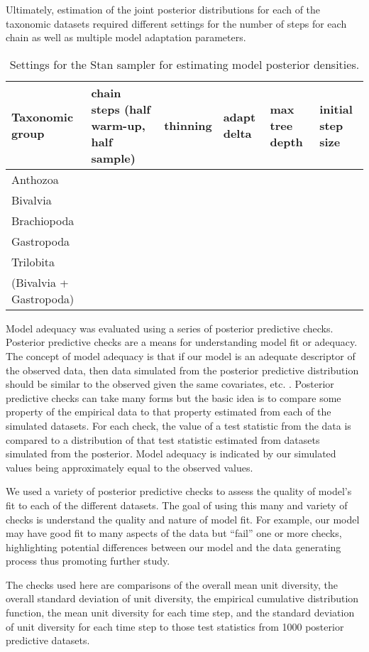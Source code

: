 \documentclass[12pt,letterpaper]{article}
\begin{document}
Ultimately, estimation of the joint posterior distributions for each of the taxonomic datasets required different settings for the number of steps for each chain as well as multiple model adaptation parameters.

\begin{table}
  \centering
  \begin{tabular}{ l l l l l l }
    Taxonomic group & chain steps (half warm-up, half sample) & thinning & adapt delta & max tree depth & initial step size \\
    \hline
    Anthozoa & & & & & \\
    Bivalvia & & & & & \\
    Brachiopoda & & & & & \\
    Gastropoda & & & & & \\
    Trilobita & & & & & \\
    (Bivalvia + Gastropoda) & & & & & \\
  \end{tabular}
  \caption{Settings for the Stan sampler for estimating model posterior densities.}
  \label{tab:sampler}
\end{table}


Model adequacy was evaluated using a series of posterior predictive checks. Posterior predictive checks are a means for understanding model fit or adequacy. The concept of model adequacy is that if our model is an adequate descriptor of the observed data, then data simulated from the posterior predictive distribution should be similar to the observed given the same covariates, etc. \citep{Gelman2013d}. Posterior predictive checks can take many forms but the basic idea is to compare some property of the empirical data to that property estimated from each of the simulated datasets. For each check, the value of a test statistic from the data is compared to a distribution of that test statistic estimated from datasets simulated from the posterior. Model adequacy is indicated by our simulated values being approximately equal to the observed values.

We used a variety of posterior predictive checks to assess the quality of model's fit to each of the different datasets. The goal of using this many and variety of checks is understand the quality and nature of model fit. For example, our model may have good fit to many aspects of the data but ``fail'' one or more checks, highlighting potential differences between our model and the data generating process thus promoting further study.

The checks used here are comparisons of the overall mean unit diversity, the overall standard deviation of unit diversity, the empirical cumulative distribution function, the mean unit diversity for each time step, and the standard deviation of unit diversity for each time step to those test statistics from 1000 posterior predictive datasets. 
\end{document}
